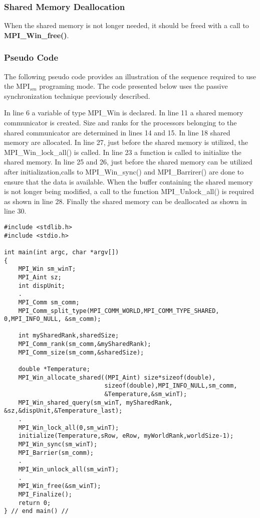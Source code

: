 \subsubsection*{Shared Memory Deallocation}
When the shared memory is not longer needed, it should be freed with a call to \textbf{MPI\_Win\_free()}.


\subsubsection*{Pseudo Code}

The following pseudo code provides an illustration of the sequence required to use the MPI$_{sm}$ programing mode. The code presented below uses the passive synchronization technique previously described.

In line 6 a variable of type MPI\_Win is declared. In line 11 a shared memory communicator is created. Size and ranks for the processors belonging to the shared communicator are determined in lines 14 and 15. In line 18  shared memory are allocated. In line 27, just before the shared memory is utilized, the MPI\_Win\_lock\_all() is called. In line 23 a function is called to initialize the shared memory. In line 25 and 26, just before the shared memory can be utilized after initialization,calls to MPI\_Win\_sync() and MPI\_Barrirer() are done to ensure that the data is available. When the buffer containing the shared memory is not longer being modified, a call to the function MPI\_Unlock\_all() is required as shown in line 28. Finally the shared memory can be deallocated as shown in line 30.

\newpage

\begin{lstlisting}[style=CStyle]
#include <stdlib.h>
#include <stdio.h>

int main(int argc, char *argv[])
{
    MPI_Win sm_winT;
    MPI_Aint sz;
    int dispUnit;
    .
    MPI_Comm sm_comm;
    MPI_Comm_split_type(MPI_COMM_WORLD,MPI_COMM_TYPE_SHARED, 0,MPI_INFO_NULL, &sm_comm);

    int mySharedRank,sharedSize;
    MPI_Comm_rank(sm_comm,&mySharedRank);
    MPI_Comm_size(sm_comm,&sharedSize);

    double *Temperature;
    MPI_Win_allocate_shared((MPI_Aint) size*sizeof(double),
                            sizeof(double),MPI_INFO_NULL,sm_comm,
                            &Temperature,&sm_winT);
    MPI_Win_shared_query(sm_winT, mySharedRank, &sz,&dispUnit,&Temperature_last);
    .
    MPI_Win_lock_all(0,sm_winT);
    initialize(Temperature,sRow, eRow, myWorldRank,worldSize-1);
    MPI_Win_sync(sm_winT);
    MPI_Barrier(sm_comm);
    .
    MPI_Win_unlock_all(sm_winT);
    .
    MPI_Win_free(&sm_winT);
    MPI_Finalize();
    return 0;
} // end main() //
\end{lstlisting}



